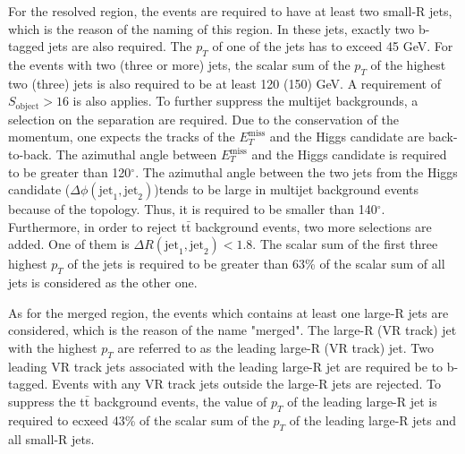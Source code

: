 \documentclass[class=NCU_thesis, crop=false]{standalone}
\begin{document}
	For the resolved region, the events are required to have at least two small-R jets, which is the reason of the naming of this region. In these jets, exactly two b-tagged jets are also required. The $p_T$ of one of the jets has to exceed 45 GeV. For the events with two (three or more) jets, the scalar sum of the $p_T$ of the highest two (three) jets is also required to be at least 120 (150) GeV. A requirement of $S_{\mathrm{object}} > 16$ is also applies. To further suppress the multijet backgrounds, a selection on the separation are required. Due to the conservation of the momentum, one expects the tracks of the $E_T^{\mathrm{miss}}$ and the Higgs candidate are back-to-back. The azimuthal angle between $E_T^{\mathrm{miss}}$ and the Higgs candidate is required to be greater than 120$^\circ$. The azimuthal angle between the two jets from the Higgs candidate ($\Delta \phi(\mathrm{jet}_1, \mathrm{jet}_2)$)tends to be large in multijet background events because of the topology. Thus, it is required to be smaller than 140$^\circ$. Furthermore, in order to reject t$\mathrm{\bar{t}}$ background events, two more selections are added. One of them is $\Delta R(\mathrm{jet}_1, \mathrm{jet}_2) < 1.8$. The scalar sum of the first three highest $p_T$ of the jets is required to be greater than 63\% of the scalar sum of all jets is considered as the other one.
	
	As for the merged region, the events which contains at least one large-R jets are considered, which is the reason of the name "merged". The large-R (VR track) jet with the highest $p_T$ are referred to as the leading large-R (VR track) jet. Two leading VR track jets associated with the leading large-R jet are required be to b-tagged. Events with any VR track jets outside the large-R jets are rejected. To suppress the t$\mathrm{\bar{t}}$ background events, the value of $p_T$ of the leading large-R jet is required to ecxeed 43\% of the scalar sum of the $p_T$ of the leading large-R jets and all small-R jets.
\end{document}

